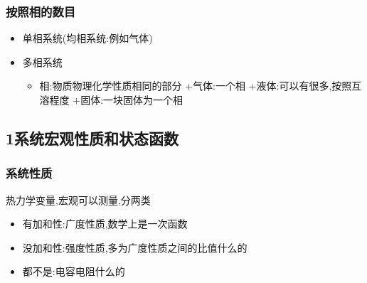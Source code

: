 \documentclass[11pt]{article}
\begin{document}
\subsubsection{按照相的数目}
\label{sec:org00cc3e0}
\begin{itemize}
\item 单相系统(均相系统:例如气体)
\item 多相系统
\begin{itemize}
\item 相:物质物理化学性质相同的部分
+气体:一个相
+液体:可以有很多,按照互溶程度
+固体:一块固体为一个相
\end{itemize}
\end{itemize}
\subsection{1系统宏观性质和状态函数}
\label{sec:org4940f3f}
\subsubsection{系统性质}
\label{sec:orgc71da38}
热力学变量,宏观可以测量,分两类
\begin{itemize}
\item 有加和性:广度性质,数学上是一次函数
\item 没加和性:强度性质,多为广度性质之间的比值什么的
\item 都不是:电容电阻什么的
\end{itemize}
\end{document}

